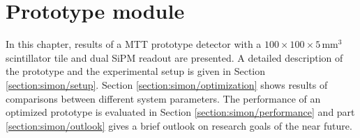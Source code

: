 \newcommand{\image}[4][!htb]{
  \begin{figure}[#1]
    \centering
    \texttt{[image: \#3]}
    \caption{#4}
    \label{image:#3}
  \end{figure}
}
%
\newcommand{\doubleimage}[9][!htb]{
  \begin{figure}[#1]
    \centering
    \subfloat[#4]{\texttt{[image: \#3]}}
    \hspace{#9}
    \subfloat[#7]{\texttt{[image: \#6]}}
    \caption{#8}
    \label{image:#3}
  \end{figure}
}
\newpage
\section{Prototype module}
\label{section:simon}
In this chapter, results of a MTT prototype detector with a $100 \times 100 \times 5 \,\text{mm}^3$ scintillator tile and dual SiPM readout are presented. A detailed description of the prototype and the experimental setup is given in Section \ref{section:simon/setup}. Section \ref{section:simon/optimization} shows results of comparisons between different system parameters. The performance of an optimized prototype is evaluated in Section \ref{section:simon/performance} and part \ref{section:simon/outlook} gives a brief outlook on research goals of the near future.
%




